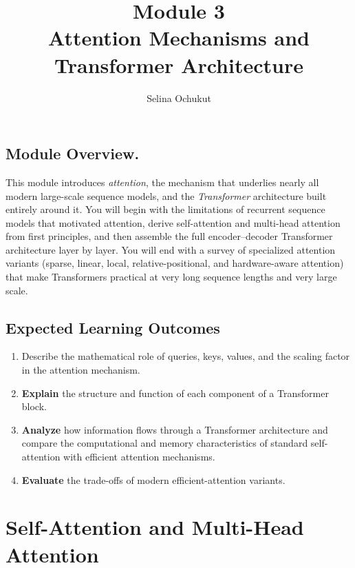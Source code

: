 \documentclass[11pt]{article}
\title{\color{moduleblue}\Huge \textbf{Module 3}\\[0.3em]
\Large Attention Mechanisms and Transformer Architecture}
\author{Selina Ochukut}
\date{}
\begin{document}
\maketitle

\begin{tcolorbox}[colback=moduleblue!6, colframe=moduleblue, arc=2mm, boxrule=1pt]
\subsection*{Module Overview.}
 This module introduces \emph{attention}, the mechanism that underlies nearly all modern large-scale sequence models, and the \emph{Transformer} architecture built entirely around it. You will begin with the limitations of recurrent sequence models that motivated attention, derive self-attention and multi-head attention from first principles, and then assemble the full encoder--decoder Transformer architecture layer by layer. You will end with a survey of specialized attention variants (sparse, linear, local, relative-positional, and hardware-aware attention) that make Transformers practical at very long sequence lengths and very large scale. 
\end{tcolorbox}

\subsection*{Expected Learning Outcomes}
\begin{enumerate}
    \item Describe the mathematical role of queries, keys, values, and the scaling factor in the attention mechanism.
    
    \item \textbf{Explain} the structure and function of each component of a Transformer block.
    
    \item \textbf{Analyze} how information flows through a Transformer architecture and compare the computational and memory characteristics of standard self-attention with efficient attention mechanisms.
    
    \item \textbf{Evaluate} the trade-offs of modern efficient-attention variants.
\end{enumerate}

\newpage

\section*{Self-Attention and Multi-Head Attention}
\end{document}
